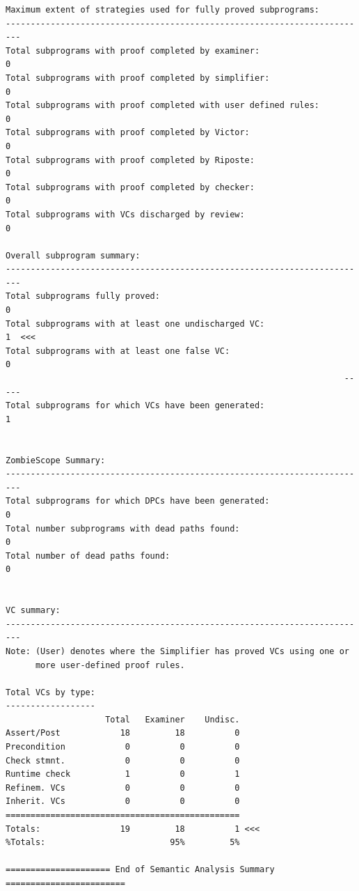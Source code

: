 \documentclass[a4paper, titlepage]{article}
\begin{document}
{\begin{lstlisting}
Maximum extent of strategies used for fully proved subprograms:
-------------------------------------------------------------------------
Total subprograms with proof completed by examiner:                     0
Total subprograms with proof completed by simplifier:                   0
Total subprograms with proof completed with user defined rules:         0
Total subprograms with proof completed by Victor:                       0
Total subprograms with proof completed by Riposte:                      0
Total subprograms with proof completed by checker:                      0
Total subprograms with VCs discharged by review:                        0

Overall subprogram summary:
-------------------------------------------------------------------------
Total subprograms fully proved:                                         0
Total subprograms with at least one undischarged VC:                    1  <<<
Total subprograms with at least one false VC:                           0
                                                                    -----
Total subprograms for which VCs have been generated:                    1


ZombieScope Summary:
-------------------------------------------------------------------------
Total subprograms for which DPCs have been generated:                   0
Total number subprograms with dead paths found:                         0
Total number of dead paths found:                                       0


VC summary:
-------------------------------------------------------------------------
Note: (User) denotes where the Simplifier has proved VCs using one or
      more user-defined proof rules.

Total VCs by type:
------------------
                    Total   Examiner    Undisc.
Assert/Post            18         18          0
Precondition            0          0          0
Check stmnt.            0          0          0
Runtime check           1          0          1
Refinem. VCs            0          0          0
Inherit. VCs            0          0          0
===============================================
Totals:                19         18          1 <<<
%Totals:                         95%         5%

===================== End of Semantic Analysis Summary ========================
\end{lstlisting}
}
\end{document}
